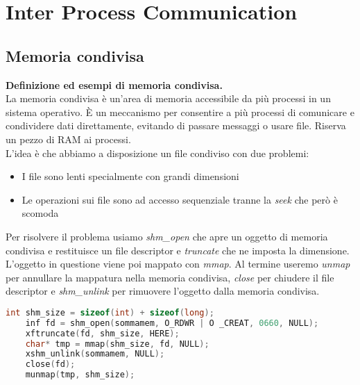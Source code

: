 \newpage
\section{Inter Process Communication}

\subsection{Memoria condivisa}
\textbf{Definizione ed esempi di memoria condivisa.}\\
La memoria condivisa è un'area di memoria accessibile da più processi in un sistema operativo. È un meccanismo per consentire a più processi di comunicare e condividere dati direttamente, evitando di passare messaggi o usare file. Riserva un pezzo di RAM ai processi.\\
L'idea è che abbiamo a disposizione un file condiviso con due problemi:
\begin{itemize}
	\item I file sono lenti specialmente con grandi dimensioni
	\item Le operazioni sui file sono ad accesso sequenziale tranne la \textit{seek} che però è scomoda
\end{itemize}
Per risolvere il problema usiamo \textit{shm\_open} che apre un oggetto di memoria condivisa e restituisce un file descriptor e \textit{truncate} che ne imposta la dimensione. L'oggetto in questione viene poi mappato con \textit{mmap}. Al termine useremo \textit{unmap} per annullare la mappatura nella memoria condivisa, \textit{close} per chiudere il file descriptor e \textit{shm\_unlink} per rimuovere l'oggetto dalla memoria condivisa.
\begin{lstlisting}[language=C]
	int shm_size = sizeof(int) + sizeof(long);
	inf fd = shm_open(sommamem, O_RDWR | O _CREAT, 0660, NULL);
	xftruncate(fd, shm_size, HERE);
	char* tmp = mmap(shm_size, fd, NULL);
	xshm_unlink(sommamem, NULL);
	close(fd);
	munmap(tmp, shm_size);
\end{lstlisting}


